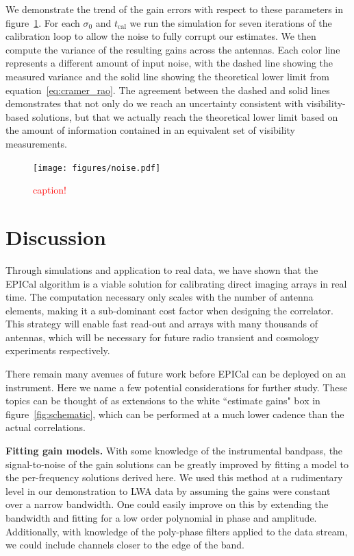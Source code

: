 \documentclass[a4paper,fleqn,usenatbib]{../mnras}
\begin{document}
We demonstrate the trend of the gain errors with respect to these parameters in figure~\ref{fig:noise}. For each $\sigma_0$ and $t_{\mathrm{cal}}$ we run the simulation for seven iterations of the calibration loop to allow the noise to fully corrupt our estimates. We then compute the variance of the resulting gains across the antennas. Each color line represents a different amount of input noise, with the dashed line showing the measured variance and the solid line showing the theoretical lower limit from equation~\ref{eq:cramer_rao}. The agreement between the dashed and solid lines demonstrates that not only do we reach an uncertainty consistent with visibility-based solutions, but that we actually reach the theoretical lower limit based on the amount of information contained in an equivalent set of visibility measurements. 



\begin{figure}
\begin{center}
\texttt{[image: figures/noise.pdf]}
\caption{\textcolor{red}{caption!}
}
\label{fig:noise}
\end{center}
\end{figure}

\section{Discussion}\label{sec:discussion}
Through simulations and application to real data, we have shown that the EPICal algorithm is a viable solution for calibrating direct imaging arrays in real time. The computation necessary only scales with the number of antenna elements, making it a sub-dominant cost factor when designing the correlator. This strategy will enable fast read-out and arrays with many thousands of antennas, which will be necessary for future radio transient and cosmology experiments respectively.

There remain many avenues of future work before EPICal can be deployed on an instrument. Here we name a few potential considerations for further study. These topics can be thought of as extensions to the white ``estimate gains" box in figure~\ref{fig:schematic}, which can be performed at a much lower cadence than the actual correlations.

\textbf{Fitting gain models.} With some knowledge of the instrumental bandpass, the signal-to-noise of the gain solutions can be greatly improved by fitting a model to the per-frequency solutions derived here. We used this method at a rudimentary level in our demonstration to LWA data by assuming the gains were constant over a narrow bandwidth. One could easily improve on this by extending the bandwidth and fitting for a low order polynomial in phase and amplitude. Additionally, with knowledge of the poly-phase filters applied to the data stream, we could include channels closer to the edge of the band.
\end{document}
